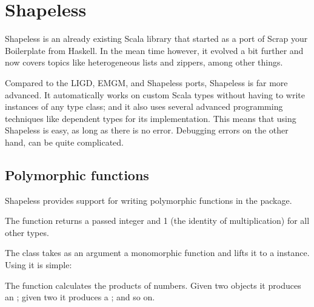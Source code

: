 \section{Shapeless}

Shapeless is an already existing Scala library that started as a port of Scrap your
Boilerplate\cite{DBLP:conf/tldi/LammelJ03} from Haskell. In the mean time however,
it evolved a bit further and now covers topics like heterogeneous lists and
zippers, among other things.

Compared to the LIGD, EMGM, and Shapeless ports, Shapeless is far more
advanced. It automatically works on custom Scala types without having to
write instances of any type class; and it also uses several advanced programming
techniques like dependent types for its implementation. This means that using
Shapeless is easy, as long as there is no error. Debugging errors on the other
hand, can be quite complicated.

\subsection{Polymorphic functions}
Shapeless provides support for writing polymorphic functions in the
 package.

\begin{example}
  The function  returns a passed integer and 1 (the identity of
  multiplication) for all other types.

  
\end{example}

\begin{example}
  The class  takes as an argument a monomorphic function
  and lifts it to a  instance. Using it is simple:

  
\end{example}

\begin{example}
  The function  calculates the products of numbers. Given two 
  objects it produces an ; given two  it produces a ;
  and so on.
  
\end{example}

